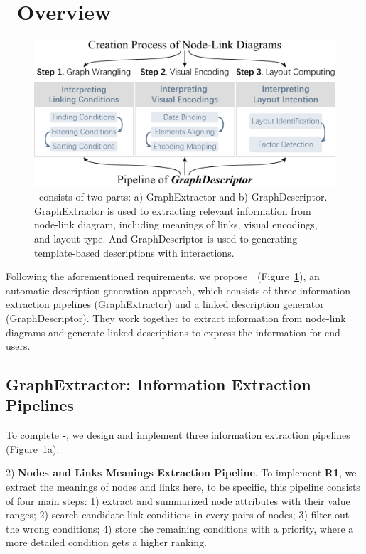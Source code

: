 \section{\ApproachName~Overview} \label{sec:overview}

\begin{figure}[t]
    \centering
    \includegraphics[width=2\columnwidth]{figures/workflow.eps}
    \caption{\ApproachName~consists of two parts: a) GraphExtractor and b) GraphDescriptor. GraphExtractor is used to extracting relevant information from node-link diagram, including meanings of links, visual encodings, and layout type. And GraphDescriptor is used to generating template-based descriptions with interactions. 
    }
    \label{fig:workflow}
\end{figure}

Following the aforementioned requirements, we propose~\ApproachName~(Figure~\ref{fig:workflow}), an automatic description generation approach, which consists of three information extraction pipelines (GraphExtractor) and a linked description generator (GraphDescriptor). They work together to extract information from node-link diagrams and generate linked descriptions to express the information for end-users.

\subsection{GraphExtractor: Information Extraction Pipelines}

To complete \textbf{-}, we design and implement three information extraction pipelines (Figure~\ref{fig:workflow}a):

2) \textbf{Nodes and Links Meanings Extraction Pipeline}. 
To implement \textbf{R1}, we extract the meanings of nodes and links here, to be specific, this pipeline consists of four main steps: 1) extract and summarized node attributes with their value ranges; 2) search candidate link conditions in every pairs of nodes; 3) filter out the wrong conditions; 4) store the remaining conditions with a priority, where a more detailed condition gets a higher ranking.



